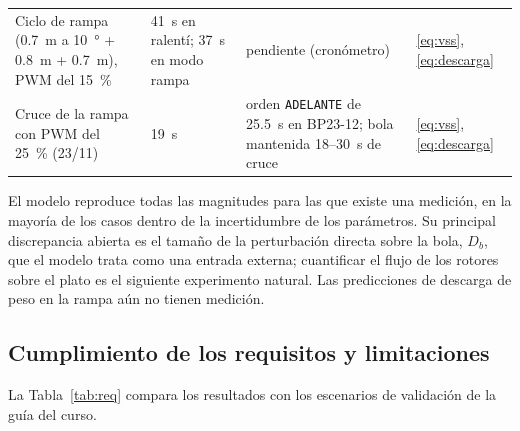 \begin{small}
\begin{longtable}{@{}>{\raggedright\arraybackslash}p{}>{\raggedright\arraybackslash}p{}>{\raggedright\arraybackslash}p{}>{\raggedright\arraybackslash}p{}@{}}
Ciclo de rampa (\SI{0.7}{\metre} a \SI{10}{\degree} + \SI{0.8}{\metre} + \SI{0.7}{\metre}), PWM del \SI{15}{\percent} & \SI{41}{\second} en ralentí; \SI{37}{\second} en modo rampa & pendiente (cronómetro) & \eqref{eq:vss}, \eqref{eq:descarga} \\
Cruce de la rampa con PWM del \SI{25}{\percent} (23/11) & \SI{19}{\second} & orden \texttt{ADELANTE} de \SI{25.5}{\second} en BP23-12; bola mantenida 18--\SI{30}{\second} de cruce & \eqref{eq:vss}, \eqref{eq:descarga} \\
\bottomrule
\end{longtable}
\end{small}

El modelo reproduce todas las magnitudes para las que existe una medición, en la mayoría de los casos dentro de la incertidumbre de los parámetros. Su principal discrepancia abierta es el tamaño de la perturbación directa sobre la bola, $D_b$, que el modelo trata como una entrada externa; cuantificar el flujo de los rotores sobre el plato es el siguiente experimento natural. Las predicciones de descarga de peso en la rampa aún no tienen medición.

\subsection{Cumplimiento de los requisitos y limitaciones}
\label{sec:requirements}
\label{sec:limits}
La Tabla~\ref{tab:req} compara los resultados con los escenarios de validación de la guía del curso.

